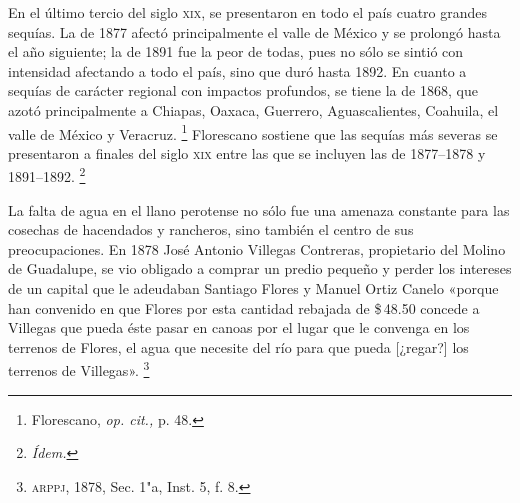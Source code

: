 \documentclass[14pt,twoside,final]{extbook} %
\let\oldfootnote\footnote
\renewcommand\footnote[1]{%
\oldfootnote{\hspace{1mm}#1}}
\begin{document}
En el último tercio del siglo \textsc{xix}, se presentaron en todo el país cuatro grandes sequías. La de 1877 afectó principalmente el valle de México y se prolongó hasta el año siguiente; la de 1891 fue la peor de todas, pues no sólo se sintió con intensidad afectando a todo el país, sino que duró hasta 1892. En cuanto a sequías de carácter regional con impactos profundos, se tiene la de 1868, que azotó principalmente a Chiapas, Oaxaca, Guerrero, Aguascalientes, Coahuila, el valle de México y Veracruz.\footnote{Florescano, \emph{op. cit.,} p. 48.} Florescano sostiene que las sequías más severas se presentaron a finales del siglo \textsc{xix} entre las que se incluyen las de 1877--1878 y 1891--1892.\footnote{\em Ídem.}

La falta de agua en el llano perotense no sólo fue una amenaza constante para las cosechas de hacendados y rancheros, sino también el centro de sus preocupaciones. En 1878 José Antonio Villegas Contreras, propietario del Molino de Guadalupe, se vio obligado a comprar un predio pequeño y perder los intereses de un capital que le adeudaban Santiago Flores y Manuel Ortiz Canelo «porque han convenido en que Flores por esta cantidad rebajada de \$\,48.50 concede a Villegas que pueda éste pasar en canoas por el lugar que le convenga en los terrenos de Flores, el agua que necesite del río para que pueda [¿regar?] los terrenos de Villegas».\footnote{\textsc{arppj}, 1878, Sec. 1"a, Inst. 5, f. 8.}
\end{document}
